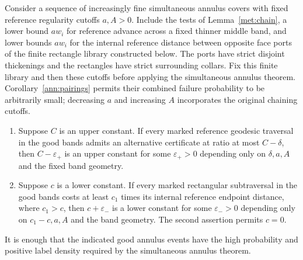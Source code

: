\begin{lemma}
\label{met:improvement}
Consider a sequence of increasingly fine simultaneous annulus covers
with fixed reference regularity cutoffs $a,A>0$.  Include the tests of
Lemma~\ref{met:chain}, a lower bound $aw_i$ for reference advance
across a fixed thinner middle band, and lower bounds $aw_i$ for the
internal reference distance between opposite face ports of the finite
rectangle library constructed below.  The ports have strict disjoint
thickenings and the rectangles have strict surrounding collars.
Fix this finite library and then these cutoffs before applying the
simultaneous annulus theorem.  Corollary~\ref{ann:pairings} permits
their combined failure probability to be arbitrarily small; decreasing
$a$ and increasing $A$ incorporates the original chaining cutoffs.
\begin{enumerate}
\item Suppose $C$ is an upper constant.  If every marked reference
geodesic traversal in the good bands admits an alternative certificate
at ratio at most $C-\delta$, then $C-\varepsilon_+$ is an upper
constant for some $\varepsilon_+>0$ depending only on
$\delta,a,A$ and the fixed band geometry.
\item Suppose $c$ is a lower constant.  If every marked rectangular
subtraversal in the good bands costs at least $c_1$ times its internal
reference endpoint distance, where $c_1>c$, then
$c+\varepsilon_-$ is a lower constant for some
$\varepsilon_->0$ depending only on $c_1-c,a,A$ and the band geometry.
The second assertion permits $c=0$.
\end{enumerate}
It is enough that the indicated good annulus events have the high
probability and positive label density required by the simultaneous
annulus theorem.
\end{lemma}

